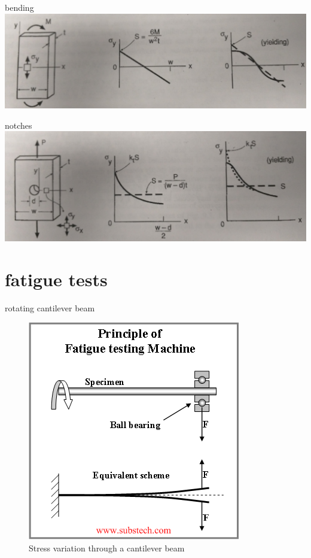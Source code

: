 \documentclass[
  letterpaper,
  ignorenonframetext,
  aspectratio=43,
  handout,
  12pt]{beamer}
\let\Oldincludegraphics\includegraphics
\renewcommand{\includegraphics}[2][]{\Oldincludegraphics[width=\textwidth,height=0.7\textheight,keepaspectratio]{#2}}
\begin{document}
\begin{frame}{bending}
\protect\hypertarget{bending}{}
\includegraphics{../images/p232-b.jpg}
\end{frame}

\begin{frame}{notches}
\protect\hypertarget{notches}{}
\includegraphics{../images/p232-c.jpg}
\end{frame}

\hypertarget{fatigue-tests}{%
\section{fatigue tests}\label{fatigue-tests}}

\begin{frame}{rotating cantilever beam}
\protect\hypertarget{rotating-cantilever-beam}{}
\begin{figure}
\centering
\includegraphics{../images/rotating_cantilever.png}
\caption{Stress variation through a cantilever beam}
\end{figure}
\end{frame}
\end{document}
